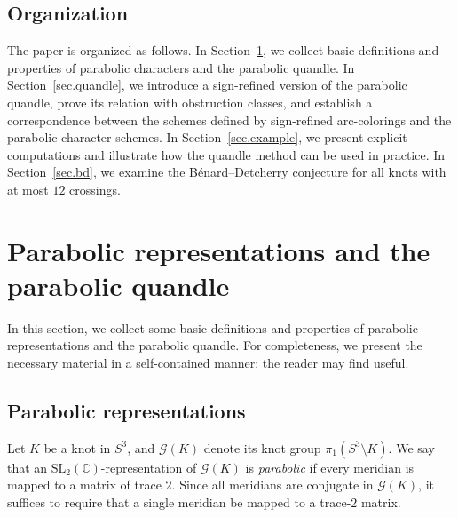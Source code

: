 \documentclass[12pt,reqno]{amsart}
\newcommand{\BC}{\mathbb{C}}
\newcommand{\calG}{\mathcal{G}}
\newcommand{\SL}{\mathrm{SL}}
\theoremstyle{definition}
\begin{document}
	\subsection{Organization}
	The paper is organized as follows. In Section~\ref{sec.prelim}, we collect basic definitions and properties of parabolic characters and the parabolic quandle. In Section~\ref{sec.quandle}, we introduce a sign-refined version of the parabolic quandle, prove its relation with obstruction classes, and establish a correspondence between the schemes defined by sign-refined arc-colorings and the parabolic character schemes. In Section~\ref{sec.example}, we present explicit computations and illustrate how the quandle method can be used in practice. In Section~\ref{sec.bd}, we examine the B\'{e}nard--Detcherry conjecture for all knots with at most $12$ crossings.
    
    \section{Parabolic representations and the parabolic quandle} \label{sec.prelim}
	
	In this section, we collect some basic definitions and properties of parabolic representations and the parabolic quandle. For completeness, we present the necessary material in a self-contained manner; the reader may find \cite{heusener2023scheme,milne1980etale} useful.

	
		
	\subsection{Parabolic representations}
	
	Let $K$ be a knot in $S^3$, and  $\calG(K)$ denote its knot group $\pi_1(S^3\setminus K)$. We say that an $\SL_2(\BC)$-representation of $\calG(K)$ is \emph{parabolic} if every meridian is mapped to a matrix of trace $2$. Since all meridians are conjugate in $\calG(K)$, it suffices to require that a single meridian be mapped to a trace-$2$ matrix.
		
\end{document}
